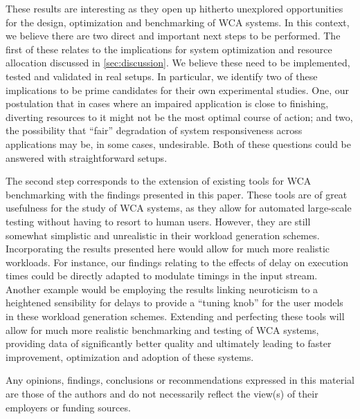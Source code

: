These results are interesting as they open up hitherto unexplored opportunities for the design, optimization and benchmarking of WCA systems.
In this context, we believe there are two direct and important next steps to be performed.
The first of these relates to the implications for system optimization and resource allocation discussed in \cref{sec:discussion}.
We believe these need to be implemented, tested and validated in real setups.
In particular, we identify two of these implications to be prime candidates for their own experimental studies.
One, our postulation that in cases where an impaired application is close to finishing, diverting resources to it might not be the most optimal course of action; and two, the possibility that ``fair'' degradation of system responsiveness across applications may be, in some cases, undesirable.
Both of these questions could be answered with straightforward setups.

The second step corresponds to the extension of existing tools for WCA benchmarking with the findings presented in this paper.
These tools are of great usefulness for the study of WCA systems, as they allow for automated large-scale testing without having to resort to human users.
However, they are still somewhat simplistic and unrealistic in their workload generation schemes.
Incorporating the results presented here would allow for much more realistic workloads.
For instance, our findings relating to the effects of delay on execution times could be directly adapted to modulate timings in the input stream.
Another example would be employing the results linking neuroticism to a heightened sensibility for delays to provide a ``tuning knob'' for the user models in these workload generation schemes.
Extending and perfecting these tools will allow for much more realistic benchmarking and testing of WCA systems, providing data of significantly better quality and ultimately leading to faster improvement, optimization and adoption of these systems.

\begin{acks}
  Any opinions, findings, conclusions or recommendations expressed in this material are those of the authors and do not necessarily reflect the view(s) of their employers or funding sources.
\end{acks}